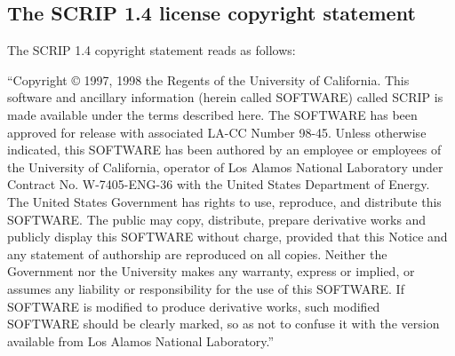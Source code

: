 \subsection{The SCRIP 1.4 license copyright statement}
\label{sec_SCRIP}

The SCRIP 1.4 copyright statement reads as follows:

 ``Copyright © 1997, 1998 the Regents of the
University of California.  This software and ancillary information
(herein called SOFTWARE) called SCRIP is made available under the
terms described here. The SOFTWARE has been approved for release with
associated LA-CC Number 98-45. Unless otherwise indicated, this
SOFTWARE has been authored by an employee or employees of the
University of California, operator of Los Alamos National Laboratory
under Contract No. W-7405-ENG-36 with the United States Department of
Energy. The United States Government has rights to use, reproduce, and
distribute this SOFTWARE. The public may copy, distribute, prepare
derivative works and publicly display this SOFTWARE without charge,
provided that this Notice and any statement of authorship are
reproduced on all copies. Neither the Government nor the University
makes any warranty, express or implied, or assumes any liability or
responsibility for the use of this SOFTWARE. If SOFTWARE is modified
to produce derivative works, such modified SOFTWARE should be clearly
marked, so as not to confuse it with the version available from Los
Alamos National Laboratory.''
